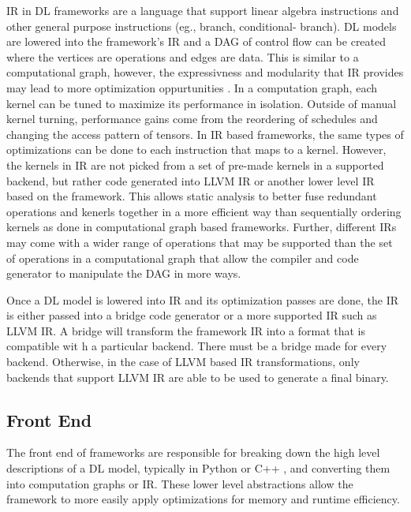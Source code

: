 IR in DL frameworks are a language that support linear algebra instructions and
other general purpose instructions (eg., branch, conditional- branch). DL
models are lowered into the framework's IR and a DAG of control flow
\cite{nGraph} can be created where the vertices are operations and edges are
data. This is similar to a computational graph, however, the expressivness and
modularity that IR provides may lead to more optimization oppurtunities
\cite{DLVM}. In a computation graph, each kernel can be tuned to maximize its
performance in isolation. Outside of manual kernel turning, performance gains
come from the reordering of schedules and changing the access pattern of
tensors.  In IR based frameworks, the same types of optimizations can be done
to each instruction that maps to a kernel. However, the kernels in IR are not
picked from a set of pre-made kernels in a supported backend, but rather code
generated into LLVM IR or another lower level IR based on the framework. This
allows static analysis to better fuse redundant operations and kenerls together
in a more efficient way than sequentially ordering kernels as done in
computational graph based frameworks. Further, different IRs may come with
a wider range of operations that may be supported than the set of operations in
a computational graph that allow the compiler and code generator to manipulate
the DAG in more ways.

Once a DL model is lowered into IR and its optimization passes are done, the IR
is either passed into a bridge code generator or a more supported IR such as
LLVM IR. A bridge will transform the framework IR into a format that is
compatible wit h a particular backend. There must be a bridge made for every
backend. Otherwise, in the case of LLVM based IR transformations, only
backends that support LLVM IR are able to be used to generate a final binary.


\subsection{Front End}
The front end of frameworks are responsible for breaking down the high level
descriptions of a DL model, typically in Python or C++ \cite{tensorflow}, and
converting them into computation graphs or IR. These lower level abstractions
allow the framework to more easily apply optimizations for memory and runtime
efficiency.

